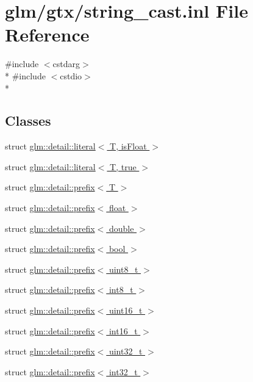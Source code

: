 \hypertarget{string__cast_8inl}{\section{glm/gtx/string\-\_\-cast.inl File Reference}
\label{string__cast_8inl}
}
{\ttfamily \#include $<$cstdarg$>$}\\*
{\ttfamily \#include $<$cstdio$>$}\\*
\subsection*{Classes}
\begin{DoxyCompactItemize}
\item 
struct \hyperlink{structglm_1_1detail_1_1literal}{glm\-::detail\-::literal$<$ T, is\-Float $>$}
\item 
struct \hyperlink{structglm_1_1detail_1_1literal_3_01T_00_01true_01_4}{glm\-::detail\-::literal$<$ T, true $>$}
\item 
struct \hyperlink{structglm_1_1detail_1_1prefix}{glm\-::detail\-::prefix$<$ T $>$}
\item 
struct \hyperlink{structglm_1_1detail_1_1prefix_3_01float_01_4}{glm\-::detail\-::prefix$<$ float $>$}
\item 
struct \hyperlink{structglm_1_1detail_1_1prefix_3_01double_01_4}{glm\-::detail\-::prefix$<$ double $>$}
\item 
struct \hyperlink{structglm_1_1detail_1_1prefix_3_01bool_01_4}{glm\-::detail\-::prefix$<$ bool $>$}
\item 
struct \hyperlink{structglm_1_1detail_1_1prefix_3_01uint8__t_01_4}{glm\-::detail\-::prefix$<$ uint8\-\_\-t $>$}
\item 
struct \hyperlink{structglm_1_1detail_1_1prefix_3_01int8__t_01_4}{glm\-::detail\-::prefix$<$ int8\-\_\-t $>$}
\item 
struct \hyperlink{structglm_1_1detail_1_1prefix_3_01uint16__t_01_4}{glm\-::detail\-::prefix$<$ uint16\-\_\-t $>$}
\item 
struct \hyperlink{structglm_1_1detail_1_1prefix_3_01int16__t_01_4}{glm\-::detail\-::prefix$<$ int16\-\_\-t $>$}
\item 
struct \hyperlink{structglm_1_1detail_1_1prefix_3_01uint32__t_01_4}{glm\-::detail\-::prefix$<$ uint32\-\_\-t $>$}
\item 
struct \hyperlink{structglm_1_1detail_1_1prefix_3_01int32__t_01_4}{glm\-::detail\-::prefix$<$ int32\-\_\-t $>$}
\item 

\end{DoxyCompactItemize}

